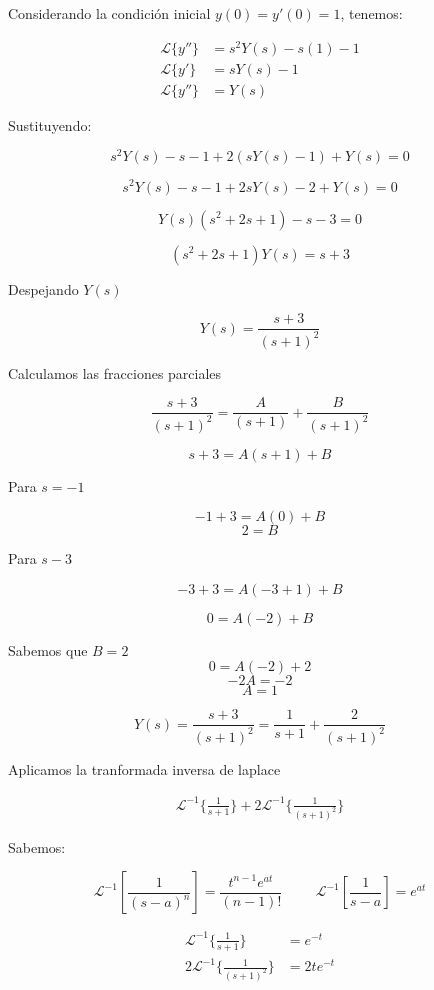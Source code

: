 \documentclass{article}
\begin{document}
Considerando la condición inicial \(y(0) = y'(0) = 1\), tenemos:

\begin{align*}
    \mathcal{L}\{y''\} & = s^2Y(s) - s(1) - 1 \\
    \mathcal{L}\{y'\}  & = sY(s) - 1          \\
    \mathcal{L}\{y''\} & = Y(s)
\end{align*}

Sustituyendo:

\[
    s^2Y(s) - s - 1 + 2(sY(s) - 1) + Y(s) = 0
\]

\[
    s^2Y(s) - s - 1 + 2sY(s) - 2 + Y(s) = 0
\]

\[
    Y(s)(s^2 + 2s + 1) - s - 3 = 0
\]

\[
    (s^2 + 2s + 1)Y(s) = s + 3
\]

Despejando $Y(s)$

\[
    Y(s) = \frac{s + 3}{(s + 1)^2}
\]

Calculamos las fracciones parciales

\[
    \frac{s + 3}{(s + 1)^2} = \frac{A}{(s + 1)} + \frac{B}{(s + 1)^2}
\]

\[s+3 = A(s+1) + B\]

Para $s=-1$

\[-1+3 = A(0) + B\]
\[2 = B\]

Para $s-3$

\[-3+3 = A(-3+1) + B\]

\[0 = A(-2) + B\]

Sabemos que $B=2$
\[0 = A(-2) + 2\]
\[-2A = -2\]
\[A = 1\]

\[
    Y(s) = \frac{s + 3}{(s + 1)^2} = \frac{1}{s+1} + \frac{2}{(s+1)^2}
\]

Aplicamos la tranformada inversa de laplace

\begin{align*}
    \mathcal{L}^{-1}\{\frac{1}{s+1}\} +  2\mathcal{L}^{-1}\{\frac{1}{(s+1)^2}\}
\end{align*}

Sabemos:

\[ \mathcal{L}^{-1}[\frac{1}{(s-a)^n}] = \frac{t^{n-1}e^{at}}{(n-1)!} \hspace{1cm} \mathcal{L}^{-1}[\frac{1}{s-a}] = e^{at}\]

\begin{align*}
    \mathcal{L}^{-1}\{\frac{1}{s+1}\}      & = e^{-t}   \\
    2\mathcal{L}^{-1}\{\frac{1}{(s+1)^2}\} & = 2te^{-t} \\
\end{align*}
\end{document}
